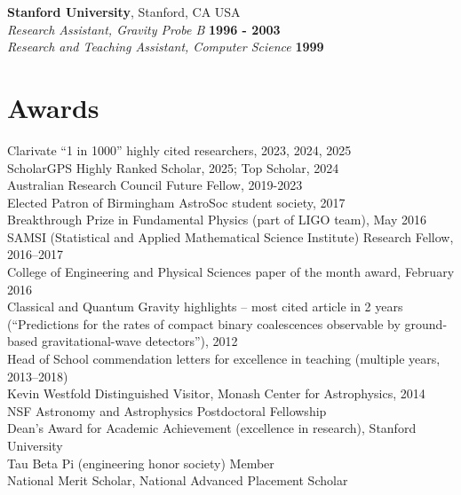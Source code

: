 \documentclass[margin,line]{res}
\begin{document}
\begin{resume}
{\bf Stanford University}, Stanford, CA USA\\
\vspace*{.02in}
{\em Research Assistant, Gravity Probe B} \hfill {\bf 1996 - 2003}\\
\vspace*{.02in}
{\em Research and Teaching Assistant, Computer Science} \hfill {\bf 1999}


\section{\sc Awards} 
Clarivate “1 in 1000” highly cited researchers, 2023, 2024, 2025\\
ScholarGPS Highly Ranked Scholar, 2025; Top Scholar, 2024\\
Australian Research Council Future Fellow, 2019-2023\\
Elected Patron of Birmingham AstroSoc student society, 2017\\
Breakthrough Prize in Fundamental Physics (part of LIGO team), May 2016\\
SAMSI (Statistical and Applied Mathematical Science Institute) Research Fellow, 2016--2017\\
College of Engineering and Physical Sciences paper of the month award, February 2016\\
Classical and Quantum Gravity highlights -- most cited article in 2 years (``Predictions for the rates of compact binary coalescences observable by ground-based gravitational-wave detectors''), 2012\\
Head of School commendation letters for excellence in teaching (multiple years, 2013--2018)\\
Kevin Westfold Distinguished Visitor, Monash Center for Astrophysics, 2014\\
NSF Astronomy and Astrophysics Postdoctoral Fellowship\\
Dean's Award for Academic Achievement (excellence in research), Stanford University\\
Tau Beta Pi (engineering honor society) Member\\
National Merit Scholar, National Advanced Placement Scholar\\



\end{resume}
\end{document}
